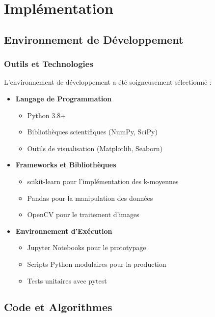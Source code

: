 \chapter{Implémentation}

\section{Environnement de Développement}

\subsection{Outils et Technologies}
L'environnement de développement a été soigneusement sélectionné :

\begin{itemize}
    \item \textbf{Langage de Programmation}
    \begin{itemize}
        \item Python 3.8+
        \item Bibliothèques scientifiques (NumPy, SciPy)
        \item Outils de visualisation (Matplotlib, Seaborn)
    \end{itemize}

    \item \textbf{Frameworks et Bibliothèques}
    \begin{itemize}
        \item scikit-learn pour l'implémentation des k-moyennes
        \item Pandas pour la manipulation des données
        \item OpenCV pour le traitement d'images
    \end{itemize}

    \item \textbf{Environnement d'Exécution}
    \begin{itemize}
        \item Jupyter Notebooks pour le prototypage
        \item Scripts Python modulaires pour la production
        \item Tests unitaires avec pytest
    \end{itemize}
\end{itemize}

\section{Code et Algorithmes}

